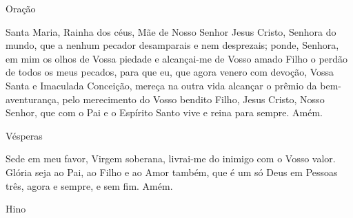 \begin{center}
    \textcolor{VioletRed3}{Oração}
\end{center}
\begin{flushleft}
    Santa Maria, Rainha dos céus, Mãe de Nosso Senhor Jesus Cristo, Senhora do mundo, que a nenhum pecador desamparais e nem desprezais; ponde, Senhora, em mim os olhos de Vossa piedade e alcançai-me de Vosso amado Filho o perdão de todos os meus pecados, para que eu, que agora venero com devoção, Vossa Santa e Imaculada Conceição, mereça na outra vida alcançar o prêmio da bem-aventurança, pelo merecimento do Vosso bendito Filho, Jesus Cristo, Nosso Senhor, que com o Pai e o Espírito Santo vive e reina para sempre. Amém.
\end{flushleft}
\newpage
\begin{center}
    Vésperas
\end{center}
\begin{flushleft}
    Sede em meu favor, Virgem soberana, livrai-me do inimigo com o Vosso valor. Glória seja ao Pai, ao Filho e ao Amor também, que é um só Deus em Pessoas três, agora e sempre, e sem fim. Amém.
\end{flushleft}
\begin{center}
    \textcolor{VioletRed3}{Hino}
\end{center}
